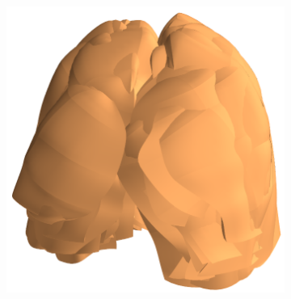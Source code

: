 {\begin{figure}[htbp] 
\centering
\begin{subfigure}{.4\linewidth}%
  \includegraphics[width=\linewidth,trim={{.0\wd0} {.0\wd0} {.0\wd0} {.0\wd0}},clip]{Segmentation/Image/ProcrustedMeshes.png}

\end{subfigure}
\end{figure}}

